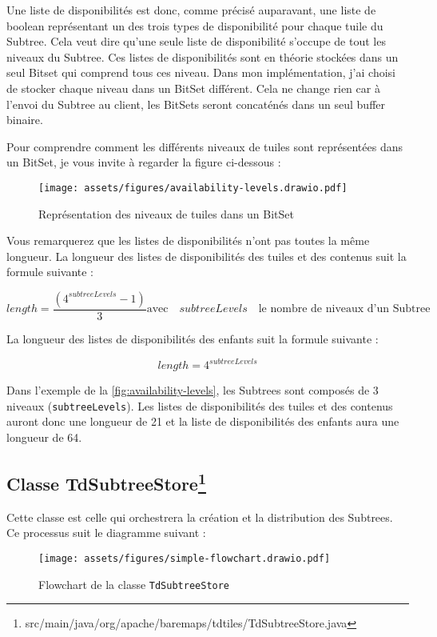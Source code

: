 Une liste de disponibilités est donc, comme précisé auparavant, une liste de boolean représentant un des trois types de disponibilité pour chaque tuile du Subtree. Cela veut dire qu'une seule liste de disponibilité s'occupe de tout les niveaux du Subtree. Ces listes de disponibilités sont en théorie stockées dans un seul Bitset qui comprend tous ces niveau. Dans mon implémentation, j'ai choisi de stocker chaque niveau dans un BitSet différent. Cela ne change rien car à l'envoi du Subtree au client, les BitSets seront concaténés dans un seul buffer binaire.

Pour comprendre comment les différents niveaux de tuiles sont représentées dans un BitSet, je vous invite à regarder la figure ci-dessous :

\begin{figure}[H]
    \centering
    \texttt{[image: assets/figures/availability-levels.drawio.pdf]}
    \caption{Représentation des niveaux de tuiles dans un BitSet}
    \label{fig:availability-levels}
\end{figure}

Vous remarquerez que les listes de disponibilités n'ont pas toutes la même longueur. La longueur des listes de disponibilités des tuiles et des contenus suit la formule suivante :

\[
length = \frac{(4^{subtreeLevels} - 1)}{3} \text{avec} \quad subtreeLevels \quad \text{le nombre de niveaux d'un Subtree}
\]

La longueur des listes de disponibilités des enfants suit la formule suivante :

\[
length = 4^{subtreeLevels}
\]

Dans l'exemple de la \autoref{fig:availability-levels}, les Subtrees sont composés de 3 niveaux (\texttt{subtreeLevels}). Les listes de disponibilités des tuiles et des contenus auront donc une longueur de 21 et la liste de disponibilités des enfants aura une longueur de 64.

\newpage
\subsection*{Classe TdSubtreeStore\footnote{src/main/java/org/apache/baremaps/tdtiles/TdSubtreeStore.java}}
\label{sec:tdsubtreestore-class}

Cette classe est celle qui orchestrera la création et la distribution des Subtrees. Ce processus suit le diagramme suivant :

\begin{figure}[H]
    \centering
    \texttt{[image: assets/figures/simple-flowchart.drawio.pdf]}
    \caption{Flowchart de la classe \texttt{TdSubtreeStore}}
    \label{fig:ssimple-flowchart}
\end{figure}

